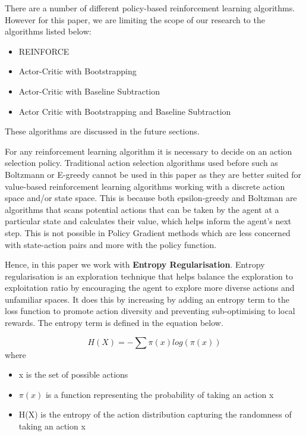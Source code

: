 \documentclass{article}
\begin{document}
\par
There are a number of different policy-based reinforcement learning algorithms. However for this paper, we are limiting the scope of our research to the algorithms listed below: 

\begin{itemize}[itemsep=0pt]
\item REINFORCE
\item Actor-Critic with Bootstrapping
\item Actor-Critic with Baseline Subtraction
\item Actor Critic with Bootstrapping and Baseline Subtraction
\end{itemize}
These algorithms are discussed in the future sections. 

\par For any reinforcement learning algorithm it is necessary to decide on an action selection policy. Traditional action selection algorithms used before such as Boltzmann or E-greedy cannot be used in this paper as they are better suited for value-based reinforcement learning algorithms working with a discrete action space and/or state space. This is because both epsilon-greedy and Boltzman are algorithms that scans potential actions that can be taken by the agent at a particular state and calculates their value, which helps inform the agent's next step. This is not possible in Policy Gradient methods which are less concerned with state-action pairs and more with the policy function. 
\par Hence, in this paper we work with \textbf{Entropy Regularisation}. Entropy regularisation is an exploration technique that helps balance the exploration to exploitation ratio by encouraging the agent to explore more diverse actions and unfamiliar spaces. It does this by increasing by adding an entropy term to the loss function to promote action diversity and preventing sub-optimising to local rewards. The entropy term is defined in the equation below. %

\begin{equation*}
H(X) = - \sum \pi(x) log(\pi(x)) %
\end{equation*}
where
\begin{itemize}
\renewcommand\labelitemi{.}
\item x is the set of possible actions
\item $\pi(x)$ is a function representing the probability of taking an action x
\item H(X) is the entropy of the action distribution capturing the randomness of taking an action x
\end{itemize}
\end{document}
